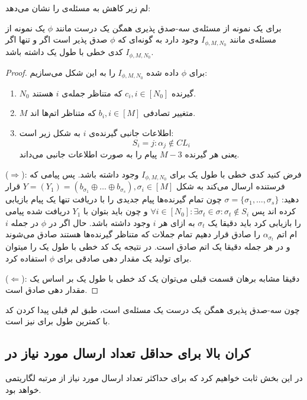 لم زیر کاهش به مسئله‌ی
\picod
را نشان می‌دهد:
\begin{lemma}
	برای یک نمونه از مسئله‌ی سه-صدق پذیری همگن یک درست مانند
	$\phi$
	یک نمونه از مسئله‌ی
	\picod
	مانند
	$I_{\phi, M, N_0}$
	وجود دارد به گونه‌ای که 
	$\phi$
	صدق پذیر است اگر و تنها اگر 
	$I_{\phi, M, N_0}$
	کدی خطی با طول یک داشته باشد.
\end{lemma}
\begin{proof}
	برای
	$\phi$
	داده شده
		$I_{\phi, M, N_0}$
		را به این شکل می‌سازیم:
		\begin{enumerate}
			\item
			$N_0$
			گیرنده
			$c_i, i \in [N_0]$
			که متناظر جمله‌ی
			$i$
			هستند.
			\item
			$M$
			متغییر تصادفی
			$b_i, i \in [M]$
			 که متناظر اتم‌ها اند.
			 \item 
			 اطلاعات جانبی گیرنده‌ی
			 $i$
			 به شکل زیر است:
			 $$S_i = {j: \alpha_j \notin CL_i}$$
			 یعنی هر گیرنده
			 $M - 3$
			 پیام را به صورت اطلاعات جانبی می‌داند.
		\end{enumerate}
		($\Rightarrow$):
		فرض کنید کدی خطی با طول یک برای
			$I_{\phi, M, N_0}$
			وجود داشته باشد. پس پیامی که فرستنده ارسال می‌کند به شکل
			$Y = (Y_1) = (b_{\sigma_1} \oplus \ldots \oplus b_{\sigma_s}), \sigma_i \in [M]$
			قرار دهید: 
			$\sigma = \{ \sigma_1, \ldots, \sigma_s \}$
			چون تمام گیرنده‌ها پیام جدیدی را با دریافت تنها یک پیام بازیابی کرده اند پس
			$\forall i \in [N_0]: \exists \sigma_t \in \sigma: \sigma_t \notin S_i$
			و چون باید بتوان با 
			$Y_1$
			دریافت شده پیامی را بازیابی کرد باید دقیقا یک
			$\sigma_t$
			به ازای هر
			$i$
			وجود داشته باشد. حال اگر در
			$\phi$
			در جمله
			$i$
			ام اتم
			$\alpha_{\sigma_t}$
			را صادق قرار دهیم تمام جملات که متناظر گیرنده‌ها هستند صادق می‌شوند و در هر جمله دقیقا یک اتم صادق است. در نتیجه یک کد خطی با طول یک را میتوان برای تولید یک مقدار دهی صادقی برای
			$\phi$
			استفاده کرد.
			
			($\Leftarrow$):
			دقیقا مشابه برهان قسمت قبلی می‌توان یک کد خطی با طول یک بر اساس یک مقدار دهی صادق است.
\end{proof}
چون سه-صدق پذیری همگن یک درست یک مسئله‌ی
\nphard
است، طبق لم قبلی پیدا کردن کد با کمترین طول برای
\lpicod
نیز
\nphard
است.
\subsection{
کران بالا برای حداقل تعداد ارسال مورد نیاز در
\picod
}
در این بخش ثابت خواهیم کرد که برای
\picodt
حداکثر تعداد ارسال مورد نیاز از مرتبه لگاریتمی خواهد بود.

